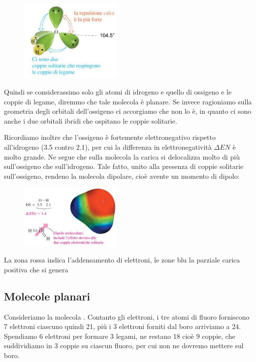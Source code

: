 \begin{figure}[htp]
\centering
\includegraphics[width=5cm]{immagini/acqua.png}
\end{figure}
Quindi se considerassimo solo gli atomi di idrogeno e quello di ossigeno e le coppie di legame, diremmo che tale molecola è planare. Se invece ragioniamo sulla geometria degli orbitali dell'ossigeno ci accorgiamo che non lo è, in quanto ci sono anche i due orbitali ibridi che ospitano le coppie solitarie.

Ricordiamo inoltre che l'ossigeno è fortemente elettronegativo rispetto all'idrogeno (3.5 contro 2.1), per cui la differenza in elettronegatività $\Delta EN$ è molto grande. Ne segue che sulla molecola la carica si delocalizza molto di più sull'ossigeno che sull'idrogeno. Tale fatto, unito alla presenza di coppie solitarie sull'ossigeno, rendeno la molecola dipolare, cioè avente un momento di dipolo:

\begin{figure}[htp]
    \centering
    \includegraphics[width=5cm]{immagini/dipolo-acqua.png}
\end{figure}

La zona rossa indica l'addensamento di elettroni, le zone blu la parziale carica positiva che si genera

\subsection{Molecole planari}
Consideriamo la molecola . Contanto gli elettroni, i tre atomi di fluoro forniscono 7 elettroni ciascuno quindi 21, più i 3 elettroni forniti dal boro arriviamo a 24. Spendiamo 6 elettroni  per formare 3 legami, ne restano 18 cioè 9 coppie, che suddividiamo in 3 coppie su ciascun fluoro, per cui non ne dovremo mettere sul boro.

